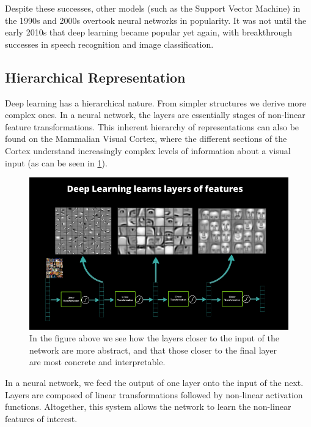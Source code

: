 Despite these successes, other models (such as the Support Vector Machine) in the 1990s and 2000s overtook neural networks in popularity.
It was not until the early 2010s that deep learning became popular yet again, with breakthrough successes in speech recognition and image classification.

\subsection{Hierarchical Representation}\label{ssec:hierarchical-representation}

Deep learning has a hierarchical nature.
From simpler structures we derive more complex ones.
In a neural network, the layers are essentially stages of non-linear feature transformations.
This inherent hierarchy of representations can also be found on the Mammalian Visual Cortex, where the different sections of the Cortex understand increasingly complex levels of information about a visual input (as can be seen in \cref{fig:deep-learning-hierarchical-features}).

\begin{figure}[ht]
\centering
\includegraphics[width=0.85\linewidth]{lecture1-part1/dl_features.png}
\caption{In the figure above we see how the layers closer to the input of the network are more abstract, and that those closer to the final layer are most concrete and interpretable.}
\label{fig:deep-learning-hierarchical-features}
\end{figure}

In a neural network, we feed the output of one layer onto the input of the next.
Layers are composed of linear transformations followed by non-linear activation functions.
Altogether, this system allows the network to learn the non-linear features of interest.

